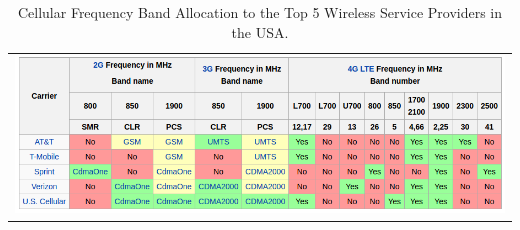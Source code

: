 \begin{table}[t]
\centering
\caption{Cellular Frequency Band Allocation to the Top 5 Wireless Service Providers in the USA. \cite{wiki:LTEBands}}
\label{table:SpectrumAllocation}
\begin{tabular}{c}
\includegraphics[width=\textwidth]{spectrum/tableSpectrumAllocation.png}
\end{tabular}
\end{table}
